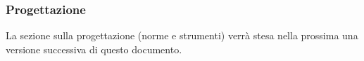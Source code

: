 	\subsubsection{Progettazione}
	La sezione sulla progettazione (norme e strumenti) verrà stesa nella prossima una versione successiva di questo documento.
